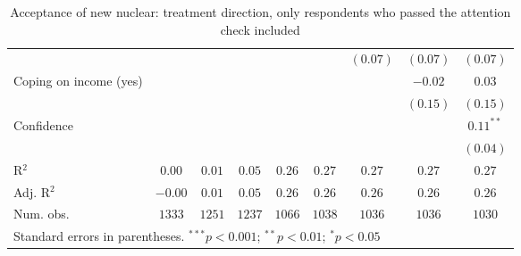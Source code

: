 \begin{table}[h]
\begin{center}
\begin{tabular}{l c c c c c c c c}
                                                                                &              &               &               &               &               & $(0.07)$      & $(0.07)$      & $(0.07)$      \\
Coping on income (yes)                                                          &              &               &               &               &               &               & $-0.02$       & $0.03$        \\
                                                                                &              &               &               &               &               &               & $(0.15)$      & $(0.15)$      \\
Confidence                                                                      &              &               &               &               &               &               &               & $0.11^{**}$   \\
                                                                                &              &               &               &               &               &               &               & $(0.04)$      \\
\hline
R$^2$                                                                           & $0.00$       & $0.01$        & $0.05$        & $0.26$        & $0.27$        & $0.27$        & $0.27$        & $0.27$        \\
Adj. R$^2$                                                                      & $-0.00$      & $0.01$        & $0.05$        & $0.26$        & $0.26$        & $0.26$        & $0.26$        & $0.26$        \\
Num. obs.                                                                       & $1333$       & $1251$        & $1237$        & $1066$        & $1038$        & $1036$        & $1036$        & $1030$        \\
\hline
\multicolumn{9}{l}{\scriptsize{Standard errors in parentheses. $^{***}p<0.001$; $^{**}p<0.01$; $^{*}p<0.05$}}
\end{tabular}
\caption{Acceptance of new nuclear: treatment direction, only respondents who passed the attention check included}
\label{table:acceptance_new_nucs_speeders_excluded}
\end{center}
\end{table}
